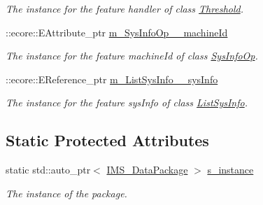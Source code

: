 \begin{DoxyCompactItemize}
\begin{DoxyCompactList}\small\item\em The instance for the feature handler of class \hyperlink{classIMS__Data_1_1Threshold}{Threshold}. \item\end{DoxyCompactList}\item 
\hypertarget{classIMS__Data_1_1IMS__DataPackage_a3d6e88e38b99d604afa2452dc579e413}{
::ecore::EAttribute\_\-ptr \hyperlink{classIMS__Data_1_1IMS__DataPackage_a3d6e88e38b99d604afa2452dc579e413}{m\_\-SysInfoOp\_\-\_\-machineId}}
\label{classIMS__Data_1_1IMS__DataPackage_a3d6e88e38b99d604afa2452dc579e413}

\begin{DoxyCompactList}\small\item\em The instance for the feature machineId of class \hyperlink{classIMS__Data_1_1SysInfoOp}{SysInfoOp}. \item\end{DoxyCompactList}\item 
\hypertarget{classIMS__Data_1_1IMS__DataPackage_a736c1956b7b4f44e416ed88234619c8f}{
::ecore::EReference\_\-ptr \hyperlink{classIMS__Data_1_1IMS__DataPackage_a736c1956b7b4f44e416ed88234619c8f}{m\_\-ListSysInfo\_\-\_\-sysInfo}}
\label{classIMS__Data_1_1IMS__DataPackage_a736c1956b7b4f44e416ed88234619c8f}

\begin{DoxyCompactList}\small\item\em The instance for the feature sysInfo of class \hyperlink{classIMS__Data_1_1ListSysInfo}{ListSysInfo}. \item\end{DoxyCompactList}\end{DoxyCompactItemize}
\subsection*{Static Protected Attributes}
\begin{DoxyCompactItemize}
\item 
\hypertarget{classIMS__Data_1_1IMS__DataPackage_acfd0d936c37756d7c62ff37118be2fe5}{
static std::auto\_\-ptr$<$ \hyperlink{classIMS__Data_1_1IMS__DataPackage}{IMS\_\-DataPackage} $>$ \hyperlink{classIMS__Data_1_1IMS__DataPackage_acfd0d936c37756d7c62ff37118be2fe5}{s\_\-instance}}
\label{classIMS__Data_1_1IMS__DataPackage_acfd0d936c37756d7c62ff37118be2fe5}

\begin{DoxyCompactList}\small\item\em The instance of the package. \item\end{DoxyCompactList}\end{DoxyCompactItemize}


